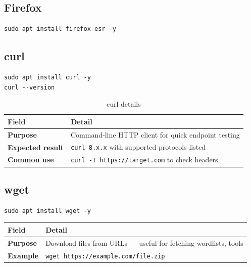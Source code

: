 \subsection{Firefox}

\begin{lstlisting}[style=terminal, caption={Install Firefox ESR}]
sudo apt install firefox-esr -y
\end{lstlisting}


\subsection{curl}

\begin{lstlisting}[style=terminal, caption={Install and verify curl}]
sudo apt install curl -y
curl --version
\end{lstlisting}

\begin{table}[H]
\centering
\caption{curl details}
\begin{tabularx}{\textwidth}{>{\bfseries}lX}
\toprule
Field & Detail \\
\midrule
Purpose & Command-line HTTP client for quick endpoint testing \\
Expected result & \texttt{curl 8.x.x} with supported protocols listed \\
Common use & \texttt{curl -I https://target.com} to check headers \\
\bottomrule
\end{tabularx}
\end{table}

\subsection{wget}

\begin{lstlisting}[style=terminal, caption={Install wget}]
sudo apt install wget -y
\end{lstlisting}

\begin{table}[H]
\centering
\begin{tabularx}{\textwidth}{>{\bfseries}lX}
\toprule
Field & Detail \\
\midrule
Purpose & Download files from URLs — useful for fetching wordlists, tools \\
Example & \texttt{wget https://example.com/file.zip} \\
\bottomrule
\end{tabularx}
\end{table}

